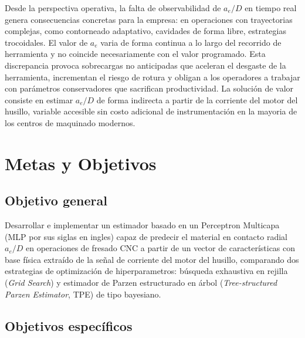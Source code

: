 \documentclass[12pt, letterpaper]{article}
\begin{document}
Desde la perspectiva operativa, la falta de observabilidad de $a_e/D$ en tiempo real genera consecuencias concretas para la empresa: en operaciones con trayectorias complejas, como contorneado adaptativo, cavidades de forma libre, estrategias trocoidales. El valor de $a_e$ varia de forma continua a lo largo del recorrido de herramienta y no coincide necesariamente con el valor programado. Esta discrepancia provoca sobrecargas no anticipadas que aceleran el desgaste de la herramienta, incrementan el riesgo de rotura y obligan a los operadores a trabajar con parámetros conservadores que sacrifican productividad. La solución de valor consiste en estimar $a_e/D$ de forma indirecta a partir de la corriente del motor del husillo, variable accesible sin costo adicional de instrumentación en la mayoria de los centros de maquinado modernos.

\section{Metas y Objetivos}

\subsection{Objetivo general}

Desarrollar e implementar un estimador basado en un Perceptron Multicapa (MLP por sus siglas en ingles) capaz de predecir el material en contacto radial $a_e/D$ en operaciones de fresado CNC a partir de un vector de características con base física extraído de la señal de corriente del motor del husillo, comparando dos estrategias de optimización de hiperparametros: búsqueda exhaustiva en rejilla (\textit{Grid Search}) y estimador de Parzen estructurado en árbol (\textit{Tree-structured Parzen Estimator}, TPE) de tipo bayesiano.

\subsection{Objetivos específicos}
\end{document}
